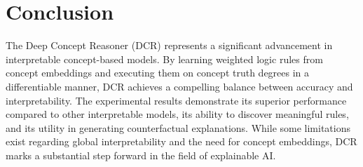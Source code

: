 \documentclass[10pt, oneside]{article}
\begin{document}
\section{Conclusion}
The Deep Concept Reasoner (DCR) represents a significant advancement in interpretable concept-based models. By learning weighted logic rules from concept embeddings and executing them on concept truth degrees in a differentiable manner, DCR achieves a compelling balance between accuracy and interpretability. The experimental results demonstrate its superior performance compared to other interpretable models, its ability to discover meaningful rules, and its utility in generating counterfactual explanations. While some limitations exist regarding global interpretability and the need for concept embeddings, DCR marks a substantial step forward in the field of explainable AI.






\end{document}
